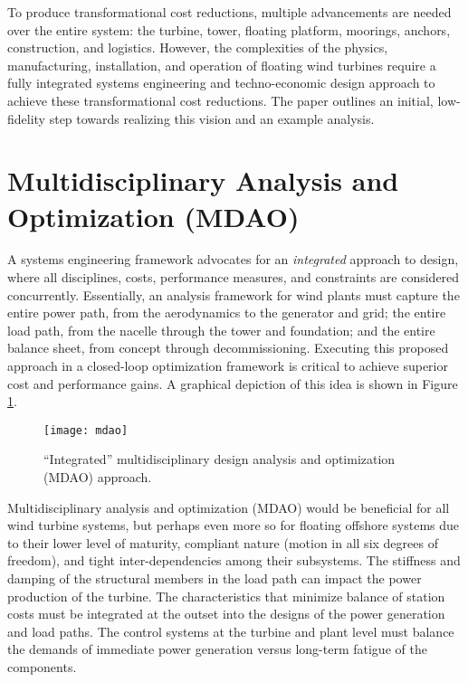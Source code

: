 To produce transformational cost reductions, multiple advancements are
needed over the entire system: the turbine, tower, floating platform,
moorings, anchors, construction, and logistics.  However, the
complexities of the physics, manufacturing, installation, and operation
of floating wind turbines require a fully integrated systems engineering
and techno-economic design approach to achieve these transformational
cost reductions.   The paper outlines an initial, low-fidelity
step towards realizing this vision and an example analysis.

\section{Multidisciplinary Analysis and Optimization (MDAO)}
A systems engineering framework advocates for an
\textit{integrated} approach to design, where all disciplines, costs,
performance measures, and constraints are considered concurrently.
Essentially, an analysis framework for wind plants must capture the
entire power path, from the aerodynamics to the generator and grid; the
entire load path, from the nacelle through the tower and foundation; and
the entire balance sheet, from concept through decommissioning.
Executing this proposed approach in a closed-loop optimization framework
is critical to achieve superior cost and performance gains.
A graphical depiction of this idea is shown in Figure
\ref{fig:mdao}.

\begin{figure}[htbp]
  \begin{center}
    \texttt{[image: mdao]}
  \caption{``Integrated'' multidisciplinary design analysis and optimization
    (MDAO) approach.}
  \label{fig:mdao}
  \end{center}
\end{figure}

Multidisciplinary analysis and optimization (MDAO) would be beneficial
for all wind turbine systems, but perhaps even more so for floating
offshore systems due to their lower level of maturity, compliant nature
(motion in all six degrees of freedom), and tight inter-dependencies
among their subsystems. The stiffness and damping of the structural
members in the load path can impact the power production of the
turbine. The characteristics that minimize balance of station costs must
be integrated at the outset into the designs of the power generation and
load paths. The control systems at the turbine and plant level must
balance the demands of immediate power generation versus long-term
fatigue of the components.


